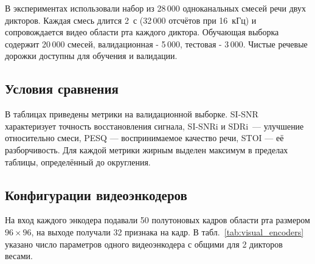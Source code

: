\documentclass[10pt,conference,compsocconf]{IEEEtran}
\begin{document}
В экспериментах использовали набор из 28\,000 одноканальных смесей речи двух дикторов. Каждая смесь длится 2~с (32\,000 отсчётов при 16~кГц) и сопровождается видео области рта каждого диктора. Обучающая выборка содержит 20\,000 смесей, валидационная - 5\,000, тестовая - 3\,000. Чистые речевые дорожки доступны для обучения и валидации.

\subsection{Условия сравнения}
В таблицах приведены метрики на валидационной выборке. SI-SNR характеризует точность восстановления сигнала, SI-SNRi и SDRi~--- улучшение относительно смеси, PESQ --- воспринимаемое качество речи, STOI --- её разборчивость. Для каждой метрики жирным выделен максимум в пределах таблицы, определённый до округления.

\subsection{Конфигурации видеоэнкодеров}

На вход каждого энкодера подавали 50 полутоновых кадров области рта размером $96 \times 96$, на выходе получали 32 признака на кадр. В табл.~\ref{tab:visual_encoders} указано число параметров одного видеоэнкодера с общими для 2 дикторов весами.

\makeatletter
\newenvironment{experimenttable}{%
  \par\addvspace{\medskipamount}\noindent\begin{minipage}{\linewidth}%
  \def\@captype{table}\centering\footnotesize\setlength{\tabcolsep}{3pt}%
}{\end{minipage}\par\nobreak\smallskip}
\makeatother
\end{document}
